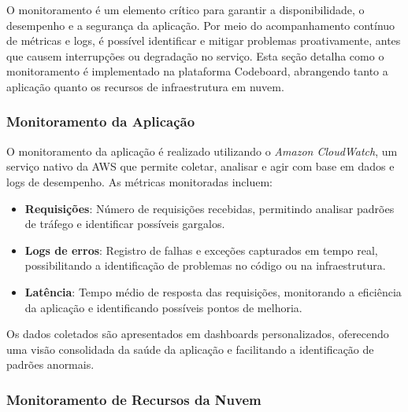 
O monitoramento é um elemento crítico para garantir a disponibilidade, o desempenho e a segurança da aplicação. Por meio do acompanhamento contínuo de métricas e logs, é possível identificar e mitigar problemas proativamente, antes que causem interrupções ou degradação no serviço. Esta seção detalha como o monitoramento é implementado na plataforma Codeboard, abrangendo tanto a aplicação quanto os recursos de infraestrutura em nuvem.

\subsubsection{Monitoramento da Aplicação}


O monitoramento da aplicação é realizado utilizando o \emph{Amazon CloudWatch}, um serviço nativo da AWS que permite coletar, analisar e agir com base em dados e logs de desempenho. As métricas monitoradas incluem:

\begin{itemize}
    \item \textbf{Requisições}: Número de requisições recebidas, permitindo analisar padrões de tráfego e identificar possíveis gargalos.
    \item \textbf{Logs de erros}: Registro de falhas e exceções capturados em tempo real, possibilitando a identificação de problemas no código ou na infraestrutura.
    \item \textbf{Latência}: Tempo médio de resposta das requisições, monitorando a eficiência da aplicação e identificando possíveis pontos de melhoria.
\end{itemize}

Os dados coletados são apresentados em dashboards personalizados, oferecendo uma visão consolidada da saúde da aplicação e facilitando a identificação de padrões anormais.


\subsubsection{Monitoramento de Recursos da Nuvem}


